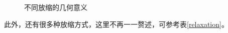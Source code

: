 \documentclass[12pt, a4paper]{article}
\begin{document}
\begin{figure}[h]
\centering
{}

\caption{不同放缩的几何意义}
\label{surrogate-to-rank}
\end{figure}
\par 此外，还有很多种放缩方式，这里不再一一赘述，可参考表\ref{relaxation}\cite{Review}。
\end{document}
